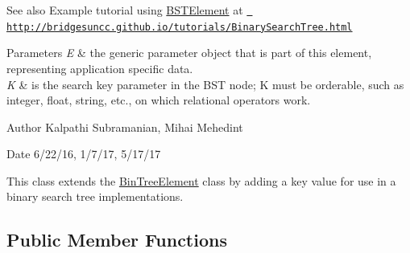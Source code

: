 \begin{DoxySeeAlso}{See also}
Example tutorial using \mbox{\hyperlink{classbridges_1_1base_1_1_b_s_t_element}{B\+S\+T\+Element}} at \href{http://bridgesuncc.github.io/tutorials/BinarySearchTree.html}{\texttt{ http\+://bridgesuncc.\+github.\+io/tutorials/\+Binary\+Search\+Tree.\+html}}
\end{DoxySeeAlso}

\begin{DoxyParams}{Parameters}
{\em E} & the generic parameter object that is part of this element, representing application specific data. \\
\hline
{\em K} & is the search key parameter in the B\+ST node; K must be orderable, such as integer, float, string, etc., on which relational operators work.\\
\hline
\end{DoxyParams}
\begin{DoxyAuthor}{Author}
Kalpathi Subramanian, Mihai Mehedint
\end{DoxyAuthor}
\begin{DoxyDate}{Date}
6/22/16, 1/7/17, 5/17/17
\end{DoxyDate}
This class extends the \mbox{\hyperlink{classbridges_1_1base_1_1_bin_tree_element}{Bin\+Tree\+Element}} class by adding a \textquotesingle{}key\textquotesingle{} value for use in a binary search tree implementations. \subsection*{Public Member Functions}

